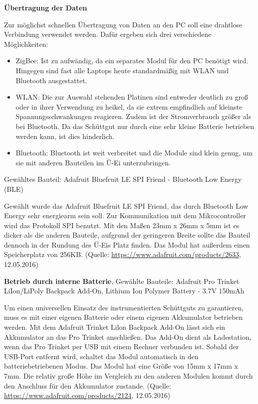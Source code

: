 \textbf{Übertragung der Daten}

Zur möglichst schnellen Übertragung von Daten an den PC soll eine drahtlose Verbindung verwendet werden. Dafür ergeben sich drei verschiedene Möglichkeiten:
\begin{itemize}
	\item ZigBee: Ist zu aufwändig, da ein separates Modul für den PC benötigt wird. Hingegen sind fast alle Laptops heute standardmäßig mit WLAN und Bluetooth ausgestattet.
	\item WLAN: Die zur Auswahl stehenden Platinen sind entweder deutlich zu groß oder in ihrer Verwendung zu heikel, da sie extrem empfindlich auf kleinste Spannungsschwankungen reagieren. Zudem ist der Stromverbrauch größer als bei Bluetooth. Da das Schüttgut nur durch eine sehr kleine Batterie betrieben werden kann, ist dies hinderlich.
	\item Bluetooth: Bluetooth ist weit verbreitet und die Module sind klein genug, um sie mit anderen Bauteilen im Ü-Ei unterzubringen.
\end{itemize}

Gewähltes Bauteil: Adafruit Bluefruit LE SPI Friend - Bluetooth Low Energy (BLE)

Gewählt wurde das Adafruit Bluefruit LE SPI Friend, das durch Bluetooth Low Energy sehr energiearm sein soll. Zur Kommunikation mit dem Mikrocontroller wird das Protokoll SPI benutzt. Mit den Maßen 23mm x 26mm x 5mm ist es dicker als die anderen Bauteile, aufgrund der geringeren Breite sollte das Bauteil dennoch in der Rundung des Ü-Eis Platz finden. Das Modul hat außerdem einen Speicherplatz von 256KB. (Quelle: \url{https://www.adafruit.com/products/2633}, 12.05.2016)

\textbf{Betrieb durch interne Batterie}, Gewählte Bauteile: Adafruit Pro Trinket LiIon/LiPoly Backpack Add-On, Lithium Ion Polymer Battery - 3.7V 150mAh

Um einen universellen Einsatz des instrumentierten Schüttguts zu garantieren, muss es mit einer eigenen Batterie oder einem eigenen Akkumulator betrieben werden. 
Mit dem Adafruit Trinket Lilon Backpack Add-On lässt sich ein Akkumulator an das Pro Trinket anschließen. Das Add-On dient als Ladestation, wenn das Pro Trinket per USB mit einem Rechner verbunden ist. Sobald der USB-Port entfernt wird, schaltet das Modul automatisch in den batteriebetriebenen Modus. Das Modul hat eine Größe von 15mm x 17mm x 7mm. Die relativ große Höhe im Vergleich zu den anderen Modulen kommt durch den Anschluss für den Akkumulator zustande. (Quelle: \url{https://www.adafruit.com/products/2124}, 12.05.2016)

